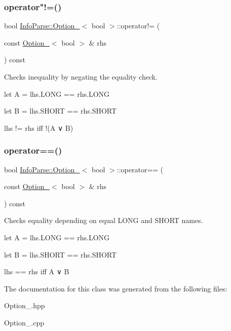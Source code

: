 \subsubsection{\texorpdfstring{operator"!=()}{operator!=()}}
{\footnotesize\ttfamily bool \mbox{\hyperlink{class_info_parse_1_1_option__}{Info\+Parse\+::\+Option\+\_\+}}$<$ bool $>$\+::operator!= (\begin{DoxyParamCaption}
                                                                                                                                            \item[{const \mbox{\hyperlink{class_info_parse_1_1_option__}{Option\+\_\+}}$<$ bool $>$ \&}]{rhs }
\end{DoxyParamCaption}) const}



Checks inequality by negating the equality check.

let A = lhs.\+L\+O\+NG == rhs.\+L\+O\+NG

let B = lhs.\+S\+H\+O\+RT == rhs.\+S\+H\+O\+RT

lhs != rhs iff !(A ∨ B) \mbox{\label{class_info_parse_1_1_option___3_01bool_01_4_ad590c478c64f49ebf6d697866b00f488}}
\subsubsection{\texorpdfstring{operator==()}{operator==()}}
{\footnotesize\ttfamily bool \mbox{\hyperlink{class_info_parse_1_1_option__}{Info\+Parse\+::\+Option\+\_\+}}$<$ bool $>$\+::operator== (\begin{DoxyParamCaption}
                                                                                                                                            \item[{const \mbox{\hyperlink{class_info_parse_1_1_option__}{Option\+\_\+}}$<$ bool $>$ \&}]{rhs }
\end{DoxyParamCaption}) const}



Checks equality depending on equal L\+O\+NG and S\+H\+O\+RT names.

let A = lhs.\+L\+O\+NG == rhs.\+L\+O\+NG

let B = lhs.\+S\+H\+O\+RT == rhs.\+S\+H\+O\+RT

lhs == rhs iff A ∨ B

The documentation for this class was generated from the following files\+:\begin{DoxyCompactItemize}
                                                                              \item
                                                                              Option\+\_\+.\+hpp\item
                                                                              Option\+\_\+.\+cpp
\end{DoxyCompactItemize}
